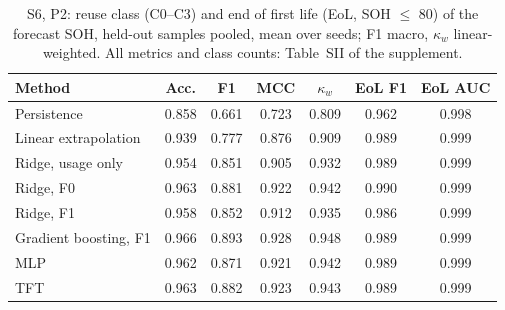 \begin{table}[t]
  \centering
  \caption{S6, P2: reuse class (C0--C3) and end of first life (EoL, SOH $\le$ 80) of the forecast SOH, held-out samples pooled, mean over seeds; F1 macro, $\kappa_w$ linear-weighted. All metrics and class counts: Table~SII of the supplement.}
  \label{tab:d30_cls_s6}
  \setlength{\tabcolsep}{3pt}
  \scriptsize
  \begin{tabular}{lcccccc}
    \toprule
    Method & Acc. & F1 & MCC & $\kappa_w$ & EoL F1 & EoL AUC \\
    \midrule
    Persistence & 0.858 & 0.661 & 0.723 & 0.809 & 0.962 & 0.998 \\
    Linear extrapolation & 0.939 & 0.777 & 0.876 & 0.909 & 0.989 & 0.999 \\
    Ridge, usage only & 0.954 & 0.851 & 0.905 & 0.932 & 0.989 & 0.999 \\
    Ridge, F0 & 0.963 & 0.881 & 0.922 & 0.942 & 0.990 & 0.999 \\
    Ridge, F1 & 0.958 & 0.852 & 0.912 & 0.935 & 0.986 & 0.999 \\
    Gradient boosting, F1 & 0.966 & 0.893 & 0.928 & 0.948 & 0.989 & 0.999 \\
    MLP & 0.962 & 0.871 & 0.921 & 0.942 & 0.989 & 0.999 \\
    TFT & 0.963 & 0.882 & 0.923 & 0.943 & 0.989 & 0.999 \\
    \bottomrule
  \end{tabular}
\end{table}
